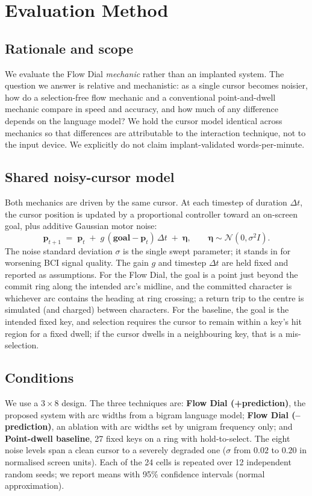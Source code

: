 \documentclass[manuscript,review,anonymous]{acmart}
\begin{document}
\section{Evaluation Method}
\subsection{Rationale and scope}
We evaluate the Flow Dial \emph{mechanic} rather than an implanted system. The
question we answer is relative and mechanistic: as a single cursor becomes
noisier, how do a selection-free flow mechanic and a conventional point-and-dwell
mechanic compare in speed and accuracy, and how much of any difference depends on
the language model? We hold the cursor model identical across mechanics so that
differences are attributable to the interaction technique, not to the input
device. We explicitly do not claim implant-validated words-per-minute.

\subsection{Shared noisy-cursor model}
Both mechanics are driven by the same cursor. At each timestep of duration
$\Delta t$, the cursor position is updated by a proportional controller toward an
on-screen goal, plus additive Gaussian motor noise:
\[
  \mathbf{p}_{t+1} \;=\; \mathbf{p}_t \;+\; g\,(\mathbf{goal}-\mathbf{p}_t)\,\Delta t \;+\; \boldsymbol{\eta}, \qquad \boldsymbol{\eta}\sim\mathcal{N}(0,\sigma^2 I).
\]
The noise standard deviation $\sigma$ is the single swept parameter; it stands in
for worsening BCI signal quality. The gain $g$ and timestep $\Delta t$ are held
fixed and reported as assumptions. For the Flow Dial, the goal is a point just
beyond the commit ring along the intended arc's midline, and the committed
character is whichever arc contains the heading at ring crossing; a return trip to
the centre is simulated (and charged) between characters. For the baseline, the
goal is the intended fixed key, and selection requires the cursor to remain
within a key's hit region for a fixed dwell; if the cursor dwells in a
neighbouring key, that is a mis-selection.

\subsection{Conditions}
We use a $3\times 8$ design. The three techniques are: \textbf{Flow Dial
(+prediction)}, the proposed system with arc widths from a bigram language model;
\textbf{Flow Dial (--prediction)}, an ablation with arc widths set by unigram
frequency only; and \textbf{Point-dwell baseline}, 27 fixed keys on a ring with
hold-to-select. The eight noise levels span a clean cursor to a severely degraded
one ($\sigma$ from $0.02$ to $0.20$ in normalised screen units). Each of the 24
cells is repeated over 12 independent random seeds; we report means with 95\%
confidence intervals (normal approximation).
\end{document}
